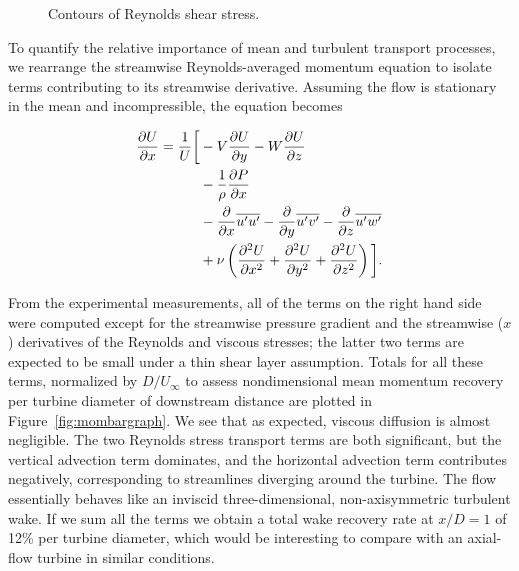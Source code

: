 \begin{figure}
    \centering
    \caption{Contours of Reynolds shear stress.}
    \label{fig:restress}
\end{figure}

To quantify the relative importance of mean and turbulent transport processes,
we rearrange the streamwise Reynolds-averaged momentum equation to isolate terms
contributing to its streamwise derivative. Assuming the flow is stationary in
the mean and incompressible, the equation becomes

\begin{equation}
    \begin{split}
        \frac{\partial U}{\partial x}  =  
        \frac{1}{U} \bigg{[}
        & - V\frac{\partial U}{\partial y}
        - W\frac{\partial U}{\partial z} \\
        & -\frac{1}{\rho}\frac{\partial P}{\partial x} \\
        & - \frac{\partial}{\partial x} \overline{u'u'}
        - \frac{\partial}{\partial y} \overline{u'v'}
        - \frac{\partial}{\partial z} \overline{u'w'} \\
        & + \nu\left(\frac{\partial^2 U}{\partial x^2}
        + \frac{\partial^2 U}{\partial y^2}
        + \frac{\partial^2 U}{\partial z^2} \right)
        \bigg{]}.
    \end{split}
\label{eq:momentum}
\end{equation}

From the experimental measurements, all of the terms on the right hand side were
computed except for the streamwise pressure gradient and the streamwise ($x$)
derivatives of the Reynolds and viscous stresses; the latter two terms are
expected to be small under a thin shear layer assumption. Totals for all these
terms, normalized by $D/U_\infty$ to assess nondimensional mean momentum
recovery per turbine diameter of downstream distance are plotted in
Figure~\ref{fig:mombargraph}. We see that as expected, viscous diffusion is
almost negligible. The two Reynolds stress transport terms are both significant,
but the vertical advection term dominates, and the horizontal advection term
contributes negatively, corresponding to streamlines diverging around the
turbine. The flow essentially behaves like an inviscid three-dimensional,
non-axisymmetric turbulent wake. If we sum all the terms we obtain a total wake
recovery rate at $x/D=1$ of 12\% per turbine diameter, which would be
interesting to compare with an axial-flow turbine in similar conditions.

